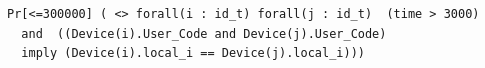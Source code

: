 \begin{lstlisting}[style=UPPAAL, caption={Query for UPPAAL asking if for all devices i and j, when they are in the location \texttt{User\_Code} will they have they then have the same value for \texttt{local\_i}.}, label={stable-network-query}, float, floatplacement='h']
Pr[<=300000] ( <> forall(i : id_t) forall(j : id_t)  (time > 3000) 
  and  ((Device(i).User_Code and Device(j).User_Code) 
  imply (Device(i).local_i == Device(j).local_i)))
\end{lstlisting}

